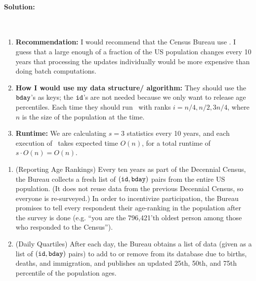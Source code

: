 \documentclass[11pt]{article}
\begin{document}
\begin{enumerate}
\begin{center}
{\begin{minipage}{.8\textwidth}
    \paragraph{Solution:}\ 
    \begin{enumerate}[label=(\roman*)]
        \item \textbf{Recommendation: }I would recommend that the Census Bureau use \QuickSelect.  I guess that a large enough of a fraction of the US population changes every 10 years that processing the updates individually would be more expensive than doing batch computations.
        \item \textbf{How I would use my data structure/ algorithm:} They should use the $\texttt{bday}$'s as keys; the $\texttt{id}$'s are not needed because we only want to release age percentiles.
        Each time they should run \QuickSelect\ with ranks $i=n/4,n/2,3n/4$, where $n$ is the size of the population at the time.
        \item \textbf{Runtime: } We are calculating $s=3$ statistics every 10 years, and each execution of \QuickSelect\ takes expected time $O(n)$, for a total runtime of $s\cdot O(n)=O(n)$.
    \end{enumerate}
    \end{minipage}
}
\end{center}


\begin{enumerate}
\item (Reporting Age Rankings)
Every ten years as part of the Decennial Census, the Bureau collects a fresh list of $(\texttt{id},\texttt{bday})$ pairs from the entire US population.
(It does not reuse data from the previous Decennial Census, so everyone is re-surveyed.)
In order to incentivize participation, the Bureau promises to tell every respondent their age-ranking in the population after the survey is done (e.g. ``you are the 796,421'th oldest person among those who responded to the Census'').







\item (Daily Quartiles)
After each day, the Bureau obtains a list of data (given as a list of $(\texttt{id},\texttt{bday})$ pairs) to add to or remove from its database due to births, deaths, and immigration, and publishes an updated 25th, 50th, and 75th percentile of the population ages.














\end{enumerate}
\end{enumerate}
\end{document}
